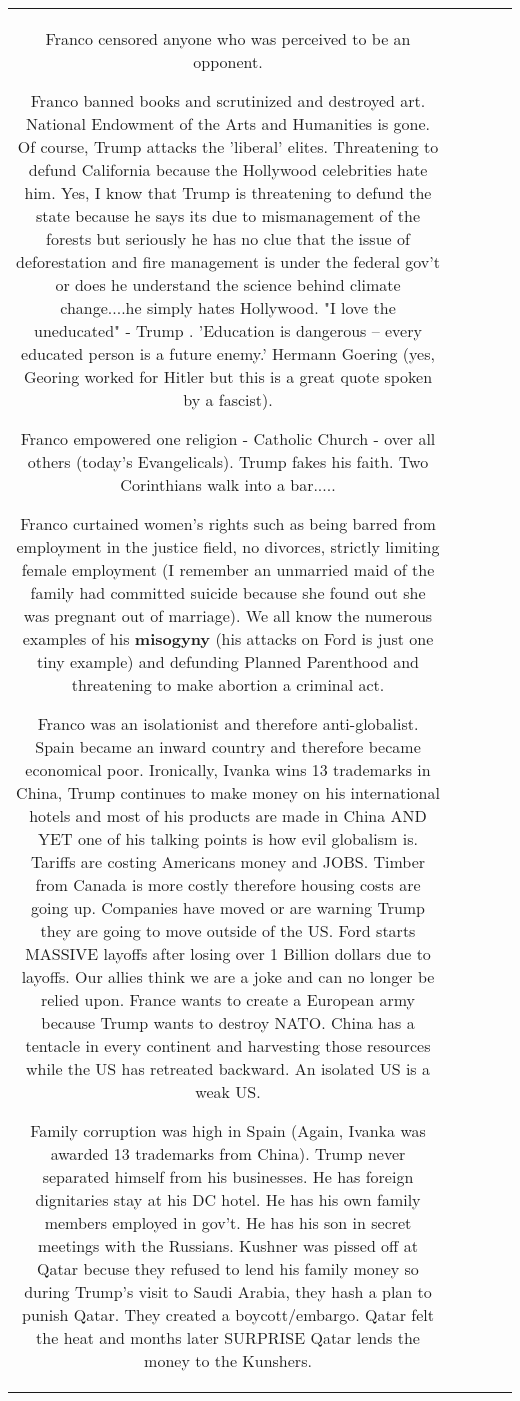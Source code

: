 \documentclass[11pt]{article}
\newlength\mylength
\begin{document}
\begin{center}
\begin{longtable}{|C{.65\mylength}|C{.30\mylength}|C{.12\mylength}|C{.12\mylength}|C{.12\mylength}|}
Franco censored anyone who was perceived to be an opponent. 

Franco banned books and scrutinized and destroyed art. 
National Endowment of the Arts and Humanities is gone. Of course, Trump attacks the 'liberal' elites. Threatening to defund California because the Hollywood celebrities hate him. Yes, I know that Trump is threatening to defund the state because he says its due to mismanagement of the forests but seriously he has no clue that the issue of deforestation and fire management is under the federal gov't or does he understand the science behind climate change....he simply hates Hollywood.  "I love the uneducated" - Trump
.  'Education is dangerous – every educated person is a future enemy.'  Hermann Goering (yes, Georing worked for Hitler but this is a great quote spoken by a fascist). 


Franco empowered one religion - Catholic Church - over all others (today's Evangelicals).  Trump fakes his faith. Two Corinthians walk into a bar.....

Franco curtained women's rights such as being barred from employment in the justice field, no divorces, strictly limiting female employment (I remember an unmarried maid of the family had committed suicide because she found out she was pregnant out of marriage).
We all know the numerous examples of his \textbf{misogyny} (his attacks on Ford is just one tiny example) and defunding Planned Parenthood and threatening to make abortion a criminal act. 

 Franco was an isolationist and therefore anti-globalist. Spain became an inward country and therefore became economical poor. Ironically, Ivanka wins 13 trademarks in China, Trump continues to make money on his international hotels and most of his products are made in China AND YET one of his talking points is how evil globalism is. Tariffs are costing Americans money and JOBS. Timber from Canada is more costly therefore housing costs are going up. Companies have moved or are warning Trump they are going to move outside of the US. Ford starts MASSIVE layoffs after losing over 1 Billion dollars due to layoffs.  Our allies think we are a joke and can no longer be relied upon. France wants to create a European army because Trump wants to destroy NATO. China has a tentacle in every continent and harvesting those resources while the US has retreated backward. An isolated US is a weak US. 

Family corruption was high in Spain (Again, Ivanka was awarded 13 trademarks from China). Trump never separated himself from his businesses. He has foreign dignitaries stay at his DC hotel. He has his own family members employed in gov't. He has his son in secret meetings with the Russians.  Kushner was pissed off at Qatar becuse they refused to lend his family money so during Trump's visit to Saudi Arabia, they hash a plan to punish Qatar. They created a boycott/embargo. Qatar felt the heat and months later SURPRISE Qatar lends the money to the Kunshers. 


\end{longtable}
\end{center}
\end{document}
